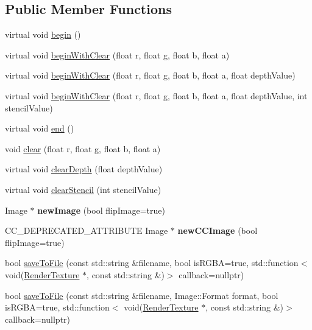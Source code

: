 \subsection*{Public Member Functions}
\begin{DoxyCompactItemize}
\item 
virtual void \hyperlink{classRenderTexture_ad56dff1562ea63017c74f358261fc3ef}{begin} ()
\item 
virtual void \hyperlink{classRenderTexture_a43ec79669c64cfdabfca4106f4323ba8}{begin\+With\+Clear} (float r, float g, float b, float a)
\item 
virtual void \hyperlink{classRenderTexture_a8bf416c7f6727b7ec435b33274a9f4f6}{begin\+With\+Clear} (float r, float g, float b, float a, float depth\+Value)
\item 
virtual void \hyperlink{classRenderTexture_a37ee1b6d28e22dc8cf263aa18557b104}{begin\+With\+Clear} (float r, float g, float b, float a, float depth\+Value, int stencil\+Value)
\item 
virtual void \hyperlink{classRenderTexture_ad22cf9b2c11fd1a0293efef2b11524e2}{end} ()
\item 
void \hyperlink{classRenderTexture_a37c190ea856c1b96af82caacca37e9ec}{clear} (float r, float g, float b, float a)
\item 
virtual void \hyperlink{classRenderTexture_a86d653a1a716ebe46631010e6b220568}{clear\+Depth} (float depth\+Value)
\item 
virtual void \hyperlink{classRenderTexture_a8c6beead393100c29a32f745f9bafd76}{clear\+Stencil} (int stencil\+Value)
\item 
\mbox{\label{classRenderTexture_a046811e9e3e960dc01e2f4ac4dd974f9}} 
Image $\ast$ {\bfseries new\+Image} (bool flip\+Image=true)
\item 
\mbox{\label{classRenderTexture_a64a8ddc3d0c22487b290082e846243ac}} 
C\+C\+\_\+\+D\+E\+P\+R\+E\+C\+A\+T\+E\+D\+\_\+\+A\+T\+T\+R\+I\+B\+U\+TE Image $\ast$ {\bfseries new\+C\+C\+Image} (bool flip\+Image=true)
\item 
bool \hyperlink{classRenderTexture_af825fb3cddf5bae91ee9e89d31c2b5d7}{save\+To\+File} (const std\+::string \&filename, bool is\+R\+G\+BA=true, std\+::function$<$ void(\hyperlink{classRenderTexture}{Render\+Texture} $\ast$, const std\+::string \&)$>$ callback=nullptr)
\item 
bool \hyperlink{classRenderTexture_a125c91da47e019bd3c2c55a8f3070d8a}{save\+To\+File} (const std\+::string \&filename, Image\+::\+Format format, bool is\+R\+G\+BA=true, std\+::function$<$ void(\hyperlink{classRenderTexture}{Render\+Texture} $\ast$, const std\+::string \&)$>$ callback=nullptr)

\end{DoxyCompactItemize}
